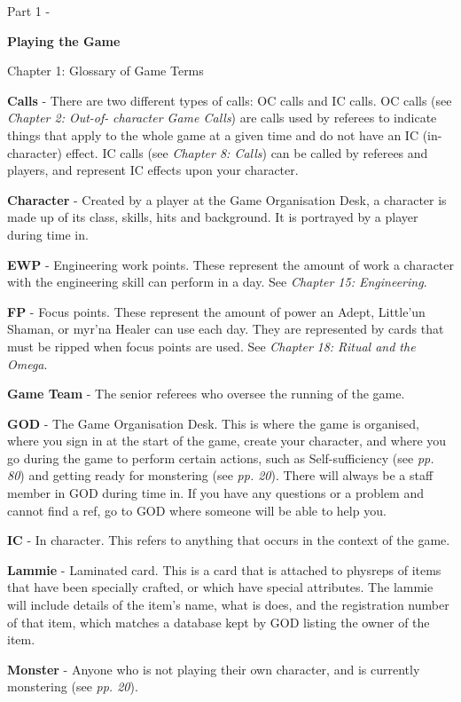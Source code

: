 \documentclass{scrbook}
\begin{document}
Part 1 -

\textbf{Playing the Game}

Chapter 1: Glossary of Game Terms

\textbf{Calls} - There are two different types of calls: OC calls and IC calls. OC calls (see \textit{Chapter 2: Out-of-} \textit{character Game Calls}) are calls used by referees to indicate things that apply to the whole game at a given time and do not have an IC (in-character) effect. IC calls (see \textit{Chapter 8: Calls}) can be called by referees and players, and represent IC effects upon your character.

\textbf{Character} - Created by a player at the Game Organisation Desk, a character is made up of its class, skills, hits and background. It is portrayed by a player during time in.

\textbf{EWP} - Engineering work points. These represent the amount of work a character with the engineering skill can perform in a day. See \textit{Chapter 15: Engineering}.

\textbf{FP} - Focus points. These represent the amount of power an Adept, Little'un Shaman, or myr'na Healer can use each day. They are represented by cards that must be ripped when focus points are used. See \textit{Chapter} \textit{18: Ritual and the Omega}.

\textbf{Game Team} - The senior referees who oversee the running of the game.

\textbf{GOD} - The Game Organisation Desk. This is where the game is organised, where you sign in at the start of the game, create your character, and where you go during the game to perform certain actions, such as Self-sufficiency (see \textit{pp. 80}) and getting ready for monstering (see \textit{pp. 20}). There will always be a staff member in GOD during time in. If you have any questions or a problem and cannot find a ref, go to GOD where someone will be able to help you.

\textbf{IC} - In character. This refers to anything that occurs in the context of the game.

\textbf{Lammie} - Laminated card. This is a card that is attached to physreps of items that have been specially crafted, or which have special attributes. The lammie will include details of the item's name, what is does, and the registration number of that item, which matches a database kept by GOD listing the owner of the item.

\textbf{Monster} - Anyone who is not playing their own character, and is currently monstering (see \textit{pp. 20}).
\end{document}
